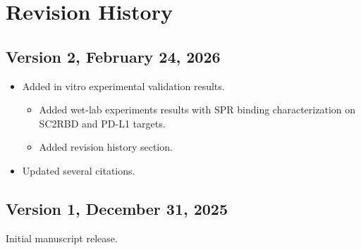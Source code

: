 \section{Revision History}
\subsection*{Version 2, February 24, 2026}

\begin{itemize} 
    \item Added in vitro experimental validation results.
    \begin{itemize}
        \item Added wet-lab experiments results with SPR binding characterization on SC2RBD and PD-L1 targets.
        \item Added revision history section.
    \end{itemize}
    \item Updated several citations.
\end{itemize}

\subsection*{Version 1, December 31, 2025}
Initial manuscript release.